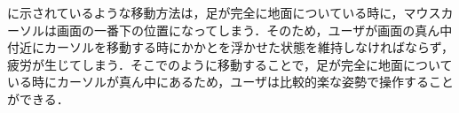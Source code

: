 に示されているような移動方法は，足が完全に地面についている時に，マウスカーソルは画面の一番下の位置になってしまう．そのため，ユーザが画面の真ん中付近にカーソルを移動する時にかかとを浮かせた状態を維持しなければならず，疲労が生じてしまう．そこでのように移動することで，足が完全に地面についている時にカーソルが真ん中にあるため，ユーザは比較的楽な姿勢で操作することができる．




